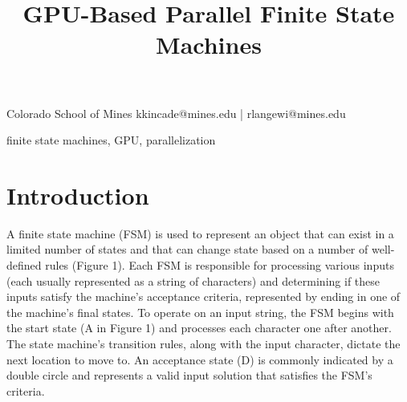 \documentclass{sigplanconf}
\begin{document}
\setlength{\pdfpageheight}{\paperheight}
\setlength{\pdfpagewidth}{\paperwidth}






\title{GPU-Based Parallel Finite State Machines}

           {Colorado School of Mines}
           {kkincade@mines.edu | rlangewi@mines.edu}

\maketitle


\terms
finite state machines, GPU, parallelization

\section{Introduction}

A finite state machine (FSM) is used to represent an object that can exist in a limited number of states and that can change state based on a number of well-defined rules (Figure 1). Each FSM is responsible for processing various inputs (each usually represented as a string of characters) and determining if these inputs satisfy the machine's acceptance criteria, represented by ending in one of the machine's final states. To operate on an input string, the FSM begins with the start state (A in Figure 1) and processes each character one after another. The state machine's transition rules, along with the input character, dictate the next location to move to. An acceptance state (D) is commonly indicated by a double circle and represents a valid input solution that satisfies the FSM's criteria.
\end{document}
